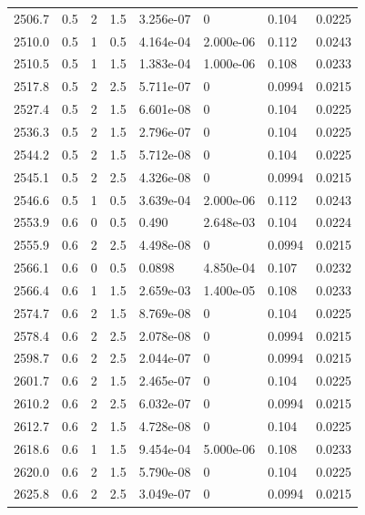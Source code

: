 \documentclass[preview]{standalone}
\begin{document}
{{{{{{{{{\begin{tabular}{L{1.2cm}C{1.2cm} C{0.3cm}C{0.5cm} C{1.4cm}C{1.4cm} C{1.4cm}C{1.4cm}}
  2506.7  &   0.5  & 2     & 1.5 &  3.256e-07  & 0  & 0.104 &  0.0225   \\ 
  2510.0  &   0.5  & 1     & 0.5 &  4.164e-04  & 2.000e-06  & 0.112 &  0.0243   \\ 
  2510.5  &   0.5  & 1     & 1.5 &  1.383e-04  & 1.000e-06  & 0.108 &  0.0233   \\ 
  2517.8  &   0.5  & 2     & 2.5 &  5.711e-07  & 0  & 0.0994 &  0.0215   \\ 
  2527.4  &   0.5  & 2     & 1.5 &  6.601e-08  & 0  & 0.104 &  0.0225   \\ 
  2536.3  &   0.5  & 2     & 1.5 &  2.796e-07  & 0  & 0.104 &  0.0225   \\ 
  2544.2  &   0.5  & 2     & 1.5 &  5.712e-08  & 0  & 0.104 &  0.0225   \\ 
  2545.1  &   0.5  & 2     & 2.5 &  4.326e-08  & 0  & 0.0994 &  0.0215   \\ 
  2546.6  &   0.5  & 1     & 0.5 &  3.639e-04  & 2.000e-06  & 0.112 &  0.0243   \\ 
  2553.9  &   0.6  & 0     & 0.5 &  0.490  & 2.648e-03  & 0.104 &  0.0224   \\ 
  2555.9  &   0.6  & 2     & 2.5 &  4.498e-08  & 0  & 0.0994 &  0.0215   \\ 
  2566.1  &   0.6  & 0     & 0.5 &  0.0898  & 4.850e-04  & 0.107 &  0.0232   \\ 
  2566.4  &   0.6  & 1     & 1.5 &  2.659e-03  & 1.400e-05  & 0.108 &  0.0233   \\ 
  2574.7  &   0.6  & 2     & 1.5 &  8.769e-08  & 0  & 0.104 &  0.0225   \\ 
  2578.4  &   0.6  & 2     & 2.5 &  2.078e-08  & 0  & 0.0994 &  0.0215   \\ 
  2598.7  &   0.6  & 2     & 2.5 &  2.044e-07  & 0  & 0.0994 &  0.0215   \\ 
  2601.7  &   0.6  & 2     & 1.5 &  2.465e-07  & 0  & 0.104 &  0.0225   \\ 
  2610.2  &   0.6  & 2     & 2.5 &  6.032e-07  & 0  & 0.0994 &  0.0215   \\ 
  2612.7  &   0.6  & 2     & 1.5 &  4.728e-08  & 0  & 0.104 &  0.0225   \\ 
  2618.6  &   0.6  & 1     & 1.5 &  9.454e-04  & 5.000e-06  & 0.108 &  0.0233   \\ 
  2620.0  &   0.6  & 2     & 1.5 &  5.790e-08  & 0  & 0.104 &  0.0225   \\ 
  2625.8  &   0.6  & 2     & 2.5 &  3.049e-07  & 0  & 0.0994 &  0.0215   \\ 

\end{tabular}}}}}}}}}}
\end{document}
